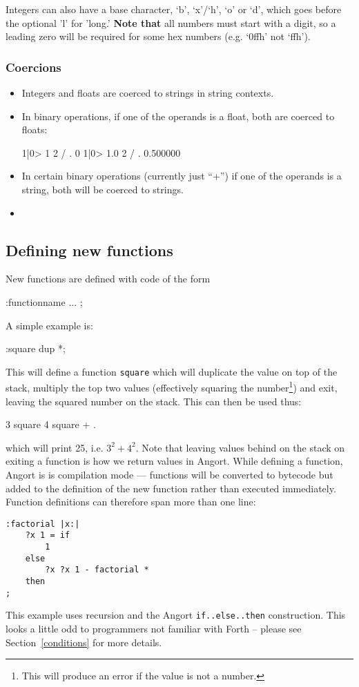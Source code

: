 Integers can also have a base character, `b', `x'/`h', `o' or `d', which
goes before the optional 'l' for 'long.' \textbf{Note that} all numbers
must start with a digit, so a leading zero will be required for some 
hex numbers (e.g. `0ffh' not `ffh').


\clearpage
\subsubsection{Coercions}
\begin{itemize}
\item Integers and floats are coerced to strings in string contexts.
\item In binary operations, if one of the operands is a float, both are coerced to floats:
\begin{v}
1|0> 1 2 / .
0
1|0> 1.0 2 / .
0.500000
\end{v}
\item In certain binary operations (currently just ``+'') if one of the operands
is a string, both will be coerced to strings.
\item {}
\end{itemize}

\subsection{Defining new functions}
New functions are defined with code of the form
\begin{v}
:functionname ... ;
\end{v}
A simple example is:
\begin{v}
:square dup *;
\end{v}
This will define a function \texttt{square} which will duplicate
the value on top of the stack, multiply the top two values
(effectively squaring the number\footnote{This will produce
an error if the value is not a number.}) and exit, leaving the
squared number on the stack. This can then be used thus:
\begin{v}
3 square 4 square + .
\end{v}
which will print 25, i.e. $3^2+4^2$. Note that leaving values behind
on the stack on exiting a function is how we return values in Angort.
While defining a function, Angort is is compilation mode --- functions will
be converted to bytecode but added to the definition of the new function
rather than executed immediately. Function definitions can therefore span
more than one line:
\begin{lstlisting}
:factorial |x:|
    ?x 1 = if
        1
    else
        ?x ?x 1 - factorial *
    then
;  
\end{lstlisting}
This example uses recursion and the Angort \texttt{if..else..then} construction.
This looks a little odd to programmers not familiar with Forth -- please
see Section~\ref{conditions} for more details.


